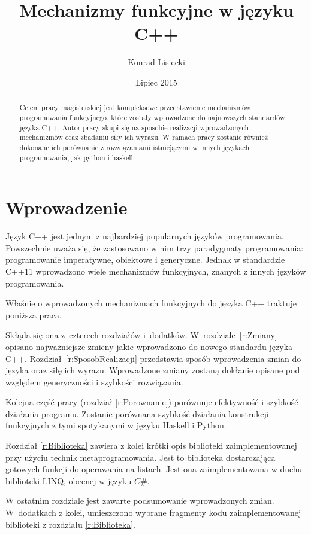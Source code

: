 \documentclass{pracamgr}
\author{Konrad Lisiecki}
\title{Mechanizmy funkcyjne w języku C++}
\date{Lipiec 2015}
\begin{document}
\tableofcontents
\maketitle

\begin{abstract}
Celem pracy magisterskiej jest kompleksowe przedstawienie mechanizmów programowania 
funkcyjnego, które zostały wprowadzone do najnowszych standardów języka C++. Autor pracy skupi się
na sposobie realizacji wprowadzonych mechanizmów oraz zbadaniu siły ich wyrazu. 
W ramach pracy zostanie również dokonane ich porównanie z rozwiązaniami istniejącymi w innych 
językach programowania, jak python i haskell.
\end{abstract}


\chapter*{Wprowadzenie}


Język C++ jest jednym z najbardziej popularnych języków programowania.
Powszechnie uważa się, że zastosowano w nim trzy paradygmaty programowania: programowanie imperatywne, obiektowe i generyczne.
Jednak w standardzie C++11 wprowadzono wiele mechanizmów funkcyjnych, znanych z innych języków programowania.

Właśnie o wprowadzonych mechanizmach funkcyjnych do języka C++ traktuje poniższa praca.

Skłąda się ona z~czterech rozdziałów i~dodatków.
W~rozdziale~\ref{r:Zmiany} opisano najważniejsze zmieny jakie wprowadzono do nowego standardu języka C++.
Rozdział~\ref{r:SposobRealizacji} przedstawia sposób wprowadzenia zmian do języka oraz siłę ich wyrazu. 
Wprowadzone zmiany zostaną dokłanie opisane pod względem generyczności i szybkości rozwiązania.


Kolejna część pracy (rozdział \ref{r:Porownanie}) porównuje efektywność i szybkość działania programu.
Zostanie porównana szybkość działania konstrukcji funkcyjnych z tymi spotykanymi w języku Haskell i Python.

Rozdział \ref{r:Biblioteka} zawiera z kolei krótki opis biblioteki zaimplementowanej przy użyciu technik 
metaprogramowania. Jest to biblioteka dostarczająca gotowych funkcji do operawania na listach. Jest ona 
zaimplementowana w duchu biblioteki LINQ, obecnej w języku $C\#$. 


W ostatnim rozdziale jest zawarte podsumowanie wprowadzonych zmian. 
W~dodatkach z kolei, umieszczono wybrane fragmenty kodu zaimplementowanej biblioteki z rozdziału \ref{r:Biblioteka}.
\end{document}
